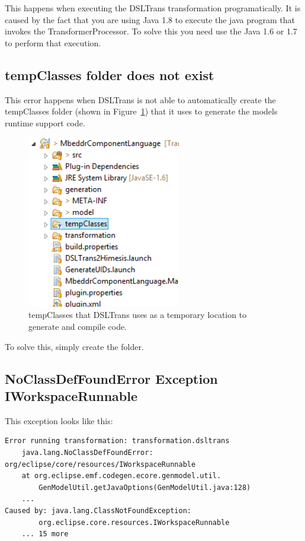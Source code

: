 This happens when executing the DSLTrans transformation programatically.
It is caused by the fact that you are using Java 1.8 to execute the java program that invokes the TransformerProcessor.
To solve this you need use the Java 1.6 or 1.7 to perform that execution.


\subsection{tempClasses folder does not exist}

This error happens when DSLTrans is not able to automatically create the
tempClasses folder (shown in Figure~\ref{fig:dsltrans_tempClasses}) that it uses
to generate the models runtime support code.

\begin{figure}[h]
\begin{center}
  \includegraphics[width=0.6\textwidth]{imgs/dsltrans_tempClasses}
  \caption{tempClasses that DSLTrans uses as a temporary location to generate and compile code.}
  \label{fig:dsltrans_tempClasses}
\end{center}
\end{figure}

To solve this, simply create the folder.


\subsection{NoClassDefFoundError Exception IWorkspaceRunnable}

This exception looks like this:

\begin{verbatim}
Error running transformation: transformation.dsltrans
	java.lang.NoClassDefFoundError: 
org/eclipse/core/resources/IWorkspaceRunnable
	at org.eclipse.emf.codegen.ecore.genmodel.util.
		GenModelUtil.getJavaOptions(GenModelUtil.java:128)
	...
Caused by: java.lang.ClassNotFoundException: 
		org.eclipse.core.resources.IWorkspaceRunnable
	... 15 more

\end{verbatim}

